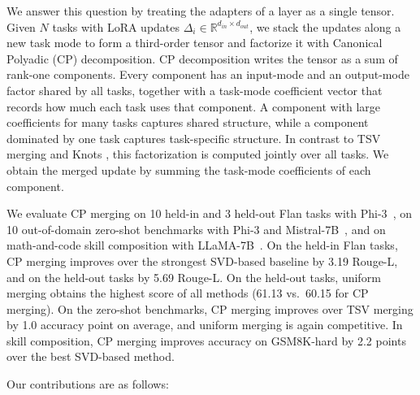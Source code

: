 \documentclass[10pt]{article} %
\begin{document}
    
    
    

 
    
    
We answer this question by treating the adapters of a layer as a single tensor. Given $N$ tasks with LoRA updates $\Delta_{i} \in \mathbb{R}^{d_{in} \times d_{out}}$, we stack the updates along a new task mode to form a third-order tensor and factorize it with Canonical Polyadic (CP) decomposition. CP decomposition writes the tensor as a sum of rank-one components. Every component has an input-mode and an output-mode factor shared by all tasks, together with a task-mode coefficient vector that records how much each task uses that component. A component with large coefficients for many tasks captures shared structure, while a component dominated by one task captures task-specific structure. In contrast to TSV merging and Knots \citep{gargiulo2025task,stoica2025model}, this factorization is computed jointly over all tasks. We obtain the merged update by summing the task-mode coefficients of each component.

We evaluate CP merging on 10 held-in and 3 held-out Flan tasks with Phi-3~\citep{arnobexploring}, on 10 out-of-domain zero-shot benchmarks with Phi-3 and Mistral-7B~\citep{ostapenko2024towards}, and on math-and-code skill composition with LLaMA-7B~\citep{prabhakar2025lora}. On the held-in Flan tasks, CP merging improves over the strongest SVD-based baseline by 3.19 Rouge-L, and on the held-out tasks by 5.69 Rouge-L. On the held-out tasks, uniform merging obtains the highest score of all methods (61.13 vs.\ 60.15 for CP merging). On the zero-shot benchmarks, CP merging improves over TSV merging by 1.0 accuracy point on average, and uniform merging is again competitive. In skill composition, CP merging improves accuracy on GSM8K-hard by 2.2 points over the best SVD-based method.

Our contributions are as follows:
\end{document}
